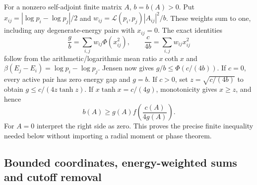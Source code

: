 \documentclass[11pt]{article}
\numberwithin{equation}{section}
\theoremstyle{definition}
\begin{document}
For a nonzero self-adjoint finite matrix $A$, $b=b(A)>0$.  Put
$x_{ij}=|\log p_i-\log p_j|/2$ and
$w_{ij}=\mathcal L(p_i,p_j)|A_{ij}|^2/b$.  These weights sum to one,
including any degenerate-energy pairs with $x_{ij}=0$.  The exact identities
\begin{equation}
 \frac{g}{b}=\sum_{i,j}w_{ij}\Phi(x_{ij}^2),\qquad
 \frac{c}{4b}=\sum_{i,j}w_{ij}x_{ij}^2
 \label{eq:falk-spectral-weights}
\end{equation}
follow from the arithmetic/logarithmic mean ratio $x\coth x$ and
$\beta(E_j-E_i)=\log p_i-\log p_j$.  Jensen now gives
$g/b\leq\Phi(c/(4b))$.  If $c=0$, every active pair has zero energy
gap and $g=b$.  If $c>0$, set $z=\sqrt{c/(4b)}$ to obtain
$g\leq c/(4z\tanh z)$.  If $x\tanh x=c/(4g)$, monotonicity gives
$x\geq z$, and hence
\begin{equation}
 b(A)\geq g(A)f\left(\frac{c(A)}{4g(A)}\right).
 \label{eq:finite-falk-bruch}
\end{equation}
For $A=0$ interpret the right side as zero.  This proves the precise finite
inequality needed below without importing a radial moment or phase theorem.

\subsection{Bounded coordinates, energy-weighted sums and cutoff removal}
\end{document}
